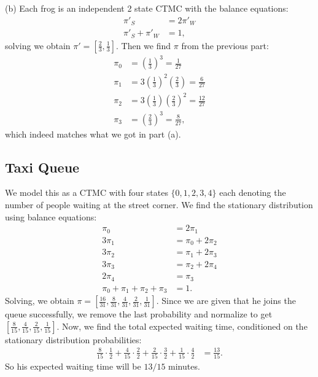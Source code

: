
(b) Each frog is an independent 2 state CTMC with the balance equations:
\begin{align*}
    \pi'_S &= 2\pi'_W \\
    \pi'_S + \pi'_W &= 1,
\end{align*}
solving we obtain $\pi' = \left[\frac{2}{3}, \frac{1}{3}\right]$. Then we find $\pi$ from the previous part:
\begin{align*}
    \pi_0 &= \left(\frac{1}{3}\right)^3 = \frac{1}{27} \\
    \pi_1 &= 3\left(\frac{1}{3}\right)^2\left(\frac{2}{3}\right) = \frac{6}{27} \\
    \pi_2 &= 3\left(\frac{1}{3}\right)\left(\frac{2}{3}\right)^2 = \frac{12}{27} \\
    \pi_3 &= \left(\frac{2}{3}\right)^3 = \frac{8}{27},
\end{align*}
which indeed matches what we got in part (a).

\subsection{Taxi Queue}
We model this as a CTMC with four states $\{0, 1, 2, 3, 4\}$ each denoting the number of people waiting at the street corner. We find the stationary distribution using balance equations:
\begin{align*}
    \pi_0 &= 2\pi_1 \\
    3\pi_1 &= \pi_0 + 2\pi_2 \\
    3\pi_2 &= \pi_1 + 2\pi_3 \\
    3\pi_3 &= \pi_2 + 2\pi_4 \\
    2\pi_4 &= \pi_3 \\
    \pi_0 + \pi_1 + \pi_2 + \pi_3 &= 1.
\end{align*}
Solving, we obtain $\pi = \left[\frac{16}{31}, \frac{8}{31}, \frac{4}{31}, \frac{2}{31}, \frac{1}{31}\right]$. Since we are given that he joins the queue successfully, we remove the last probability and normalize to get $\left[\frac{8}{15}, \frac{4}{15}, \frac{2}{15}, \frac{1}{15}\right]$. Now, we find the total expected waiting time, conditioned on the stationary distribution probabilities:
\begin{align*}
    \frac{8}{15} \cdot \frac{1}{2} + \frac{4}{15} \cdot \frac{2}{2} + \frac{2}{15} \cdot \frac{3}{2} + \frac{1}{15} \cdot \frac{4}{2} &= \frac{13}{15}.
\end{align*}
So his expected waiting time will be $13/15$ minutes.

